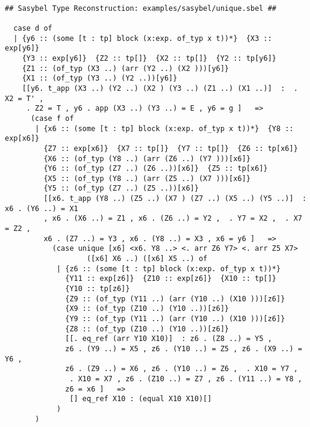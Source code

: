 \documentclass[12pt]{article}
\begin{document}
\footnotesize\begin{verbatim}

## Sasybel Type Reconstruction: examples/sasybel/unique.sbel ##

  case d of 
  | {y6 :: (some [t : tp] block (x:exp. of_typ x t))*}  {X3 :: exp[y6]} 
    {Y3 :: exp[y6]}  {Z2 :: tp[]}  {X2 :: tp[]}  {Y2 :: tp[y6]} 
    {Z1 :: (of_typ (X3 ..) (arr (Y2 ..) (X2 )))[y6]} 
    {X1 :: (of_typ (Y3 ..) (Y2 ..))[y6]}
    [[y6. t_app (X3 ..) (Y2 ..) (X2 ) (Y3 ..) (Z1 ..) (X1 ..)]  :  . X2 = T' ,
     . Z2 = T , y6 . app (X3 ..) (Y3 ..) = E , y6 = g ]   => 
      (case f of 
       | {x6 :: (some [t : tp] block (x:exp. of_typ x t))*}  {Y8 :: exp[x6]} 
         {Z7 :: exp[x6]}  {X7 :: tp[]}  {Y7 :: tp[]}  {Z6 :: tp[x6]} 
         {X6 :: (of_typ (Y8 ..) (arr (Z6 ..) (Y7 )))[x6]} 
         {Y6 :: (of_typ (Z7 ..) (Z6 ..))[x6]}  {Z5 :: tp[x6]} 
         {X5 :: (of_typ (Y8 ..) (arr (Z5 ..) (X7 )))[x6]} 
         {Y5 :: (of_typ (Z7 ..) (Z5 ..))[x6]}
         [[x6. t_app (Y8 ..) (Z5 ..) (X7 ) (Z7 ..) (X5 ..) (Y5 ..)]  : x6 . (Y6 ..) = X1
         , x6 . (X6 ..) = Z1 , x6 . (Z6 ..) = Y2 ,  . Y7 = X2 ,  . X7 = Z2 ,
         x6 . (Z7 ..) = Y3 , x6 . (Y8 ..) = X3 , x6 = y6 ]   => 
           (case unique [x6] <x6. Y8 ..> <. arr Z6 Y7> <. arr Z5 X7>
                   ([x6] X6 ..) ([x6] X5 ..) of 
            | {z6 :: (some [t : tp] block (x:exp. of_typ x t))*} 
              {Y11 :: exp[z6]}  {Z10 :: exp[z6]}  {X10 :: tp[]} 
              {Y10 :: tp[z6]} 
              {Z9 :: (of_typ (Y11 ..) (arr (Y10 ..) (X10 )))[z6]} 
              {X9 :: (of_typ (Z10 ..) (Y10 ..))[z6]} 
              {Y9 :: (of_typ (Y11 ..) (arr (Y10 ..) (X10 )))[z6]} 
              {Z8 :: (of_typ (Z10 ..) (Y10 ..))[z6]}
              [[. eq_ref (arr Y10 X10)]  : z6 . (Z8 ..) = Y5 ,
              z6 . (Y9 ..) = X5 , z6 . (Y10 ..) = Z5 , z6 . (X9 ..) = Y6 ,
              z6 . (Z9 ..) = X6 , z6 . (Y10 ..) = Z6 ,  . X10 = Y7 ,
               . X10 = X7 , z6 . (Z10 ..) = Z7 , z6 . (Y11 ..) = Y8 ,
              z6 = x6 ]   => 
               [] eq_ref X10 : (equal X10 X10)[]
            )
       )


\end{verbatim}
\end{document}
